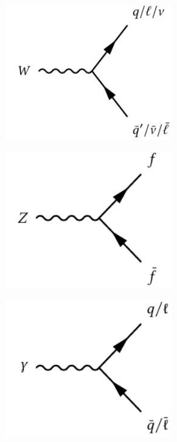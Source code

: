 \begin{figure}
	\centering
	\begin{subfigure}[b]{0.30\linewidth}
		\centering\includegraphics[width=0.8\textwidth]{w_fermion_vertex}
	\end{subfigure}
	\begin{subfigure}[b]{0.30\linewidth}
		\centering\includegraphics[width=0.8\textwidth]{z_fermion_vertex}
	\end{subfigure}
	\begin{subfigure}[b]{0.30\linewidth}
		\centering\includegraphics[width=0.8\textwidth]{gamma_fermion_vertex}

\end{subfigure}
\end{figure}
